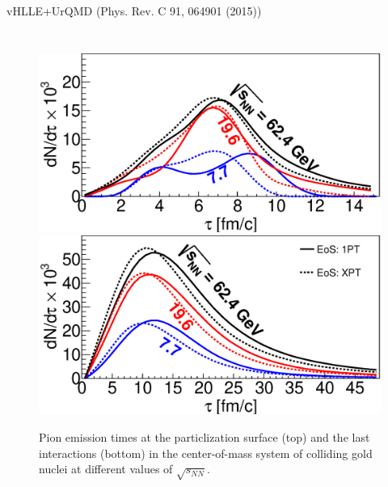 \documentclass[final,hyperref={pdfpagelabels=false}, xcolor=dvipsnames]{beamer}
\begin{document}
\begin{frame}[shrink=30]
\begin{columns}[t]
\begin{block}{vHLLE+UrQMD (Phys. Rev. C 91, 064901 (2015))}
\begin{columns}[t]
  \begin{figure}[T]
   \caption{Pion emission times at the particlization surface (top) and the last interactions (bottom) in the center-of-mass system of colliding gold nuclei at different values of $\sqrt{s_{NN}}$.}
         \includegraphics[width=1.\linewidth]{fig1b_poster.eps} \\
         \includegraphics[width=1.\linewidth]{fig1a_poster.eps}
      \end{figure}


\end{columns}
\end{block}
\end{columns}
\end{frame}
\end{document}
